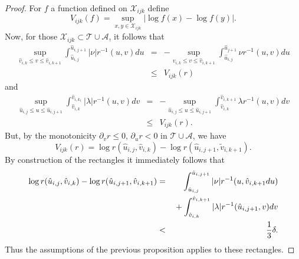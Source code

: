 \documentclass{article}
\begin{document}
{\begin{proof}
For $f$ a function defined on $\mathcal{X}_{ijk}$ 
define
\[
V_{ijk}(f)= 
\sup_{x,y\in\mathcal{X}_{ijk}}{|\log f(x) -\log f(y)|}.
\]
Now, for those $\mathcal{X}_{ijk}\subset\mathcal{T}\cup\mathcal{A}$, 
it follows that 
\begin{eqnarray*}
\sup_{\hat{v}_{i,k}\le v\le\hat {v}_{i,k+1}}
\int_{\hat{u}_{i,j}}^{\hat{u}_{i,j+1}}{|\nu|r^{-1}(u,v)du}
&=&-\sup_{\hat{v}_{i,k}\le v\le\hat {v}_{i,k+1}}
\int_{\hat{u}_{i,j}}^{\hat{u}_{j+1}}
{\nu r^{-1}(u,v)du}\\
&\le& V_{ijk}(r)
\end{eqnarray*}
and
\begin{eqnarray*}
\sup_{\hat{u}_{i,j}\le u\le\hat{u}_{i,j+1}}
\int_{\hat{v}_{i,k}}^{\hat{v}_{i,k_1}}{|\lambda|r^{-1}(u,v)dv}&=&
-\sup_{\hat{u}_{i,j}\le u\le\hat{u}_{i,j+1}}
\int_{\hat{v}_{i,k}}^{\hat{v}_{i,k+1}}
{\lambda r^{-1}(u,v)dv}\\
&\le& V_{ijk}(r).
\end{eqnarray*}
But, by the monotonicity $\partial_v{r}\le0$, $\partial_u{r}<0$
in $\mathcal{T}\cup\mathcal{A}$, we have
\[
V_{ijk}(r)=\log r(\hat{u}_{i,j},\hat{v}_{i,k})-\log r(\hat{u}_{i,j+1},\tilde{v}_{i,k+1}).
\]
By construction of the rectangles it immediately follows that
\begin{eqnarray*}
\log r(\hat{u}_{i,j},\hat{v}_{i,k})-\log r(\hat{u}_{i,j+1},\hat{v}_{i,k+1})
&=&
\int_{\hat{u}_{i,j}}^{\hat{u}_{i,j+1}}{|\nu|r^{-1}(u,\hat{v}_{i,k+1}}du)\\
&&\hbox{}+
\int_{\hat{v}_{i,k}}^{\hat{v}_{i,k+1}}{|\lambda|r^{-1}(\hat{u}_{i,j+1},v)dv}\\
&<&\frac13\delta.
\end{eqnarray*}
Thus the assumptions of the previous proposition applies to these
rectangles.


\end{proof}}
\end{document}
